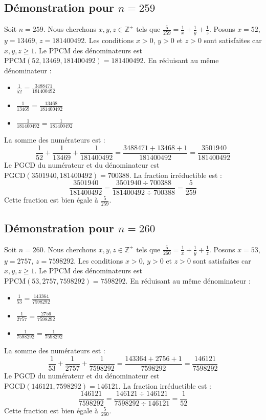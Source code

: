 \documentclass[11pt,a4paper]{article}
\begin{document}
\subsection{Démonstration pour $n = 259$}
Soit $n = 259$. Nous cherchons $x, y, z \in \mathbb{Z}^{+}$ tels que $\frac{5}{259} = \frac{1}{x} + \frac{1}{y} + \frac{1}{z}$.
Posons $x = 52$, $y = 13469$, $z = 181400492$.
Les conditions $x > 0$, $y > 0$ et $z > 0$ sont satisfaites car $x, y, z \geq 1$.
Le PPCM des dénominateurs est $\text{PPCM}(52, 13469, 181400492) = 181400492$.
En réduisant au même dénominateur :
\begin{itemize}
    \item $\frac{1}{52} = \frac{3488471}{181400492}$
    \item $\frac{1}{13469} = \frac{13468}{181400492}$
    \item $\frac{1}{181400492} = \frac{1}{181400492}$
\end{itemize}
La somme des numérateurs est :
$$ \frac{1}{52} + \frac{1}{13469} + \frac{1}{181400492} = \frac{3488471 + 13468 + 1}{181400492} = \frac{3501940}{181400492} $$
Le PGCD du numérateur et du dénominateur est $\text{PGCD}(3501940, 181400492) = 700388$.
La fraction irréductible est :
$$ \frac{3501940}{181400492} = \frac{3501940 \div 700388}{181400492 \div 700388} = \frac{5}{259} $$
Cette fraction est bien égale à $\frac{5}{259}$.

\subsection{Démonstration pour $n = 260$}
Soit $n = 260$. Nous cherchons $x, y, z \in \mathbb{Z}^{+}$ tels que $\frac{5}{260} = \frac{1}{x} + \frac{1}{y} + \frac{1}{z}$.
Posons $x = 53$, $y = 2757$, $z = 7598292$.
Les conditions $x > 0$, $y > 0$ et $z > 0$ sont satisfaites car $x, y, z \geq 1$.
Le PPCM des dénominateurs est $\text{PPCM}(53, 2757, 7598292) = 7598292$.
En réduisant au même dénominateur :
\begin{itemize}
    \item $\frac{1}{53} = \frac{143364}{7598292}$
    \item $\frac{1}{2757} = \frac{2756}{7598292}$
    \item $\frac{1}{7598292} = \frac{1}{7598292}$
\end{itemize}
La somme des numérateurs est :
$$ \frac{1}{53} + \frac{1}{2757} + \frac{1}{7598292} = \frac{143364 + 2756 + 1}{7598292} = \frac{146121}{7598292} $$
Le PGCD du numérateur et du dénominateur est $\text{PGCD}(146121, 7598292) = 146121$.
La fraction irréductible est :
$$ \frac{146121}{7598292} = \frac{146121 \div 146121}{7598292 \div 146121} = \frac{1}{52} $$
Cette fraction est bien égale à $\frac{5}{260}$.
\end{document}
